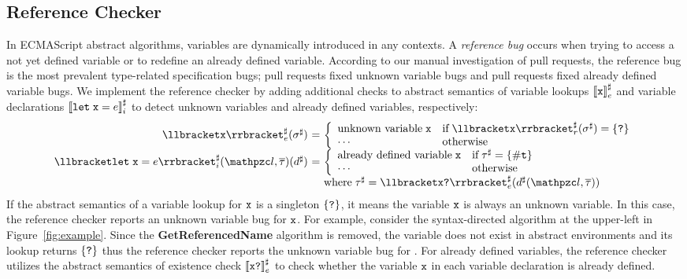 \subsection{Reference Checker}

In ECMAScript abstract algorithms, variables are dynamically introduced in any
contexts.  A \textit{reference bug} occurs when trying to access a not yet
defined variable or to redefine an already defined variable.  According to our
manual investigation of pull requests, the reference bug is the most prevalent
type-related specification bugs;  pull requests fixed 
unknown variable bugs and  pull requests fixed  already
defined variable bugs.  We implement the reference checker by adding additional
checks to abstract semantics of variable lookups ${\llbracket{\texttt{x}}\rrbracket}^\sharp_e$ and variable
declarations ${\llbracket{\texttt{let}\; \texttt{x}= e}\rrbracket}^\sharp_i$ to detect unknown variables and
already defined variables, respectively:
\[
  \begin{array}{r@{~}c@{~}l}
    \aseme{\x}(\aenv) &=& \left\{
      \begin{array}{ll}
        \text{unknown variable} \; $\x$
        & \text{if} \; \asemr{\x}(\aenv) = \{ \tabsent \}\\
        \cdots
        & \text{otherwise}\\
      \end{array}
    \right.\\

    \asemi{\kwlet \; \x = \expr}(\lab, \tys)(\aelem) &=& \left\{
      \begin{array}{ll}
        \text{already defined variable} \; $\x$
        & \text{if} \; \aty = \{ \true \}\\
        \cdots
        & \text{otherwise}\\
      \end{array}
    \right.\\ &&
    \text{where} \; \aty = \aseme{\x \kwexists}(\aelem(\lab, \tys))\\
  \end{array}
\]
If the abstract semantics of a variable lookup for $\texttt{x}$ is a singleton $\{
\texttt{?} \}$, it means the variable $\texttt{x}$ is always an unknown variable.  In this
case, the reference checker reports an unknown variable bug for $\texttt{x}$.  For
example, consider the syntax-directed algorithm at the upper-left in
Figure~\ref{fig:example}.  Since the \textbf{GetReferencedName} algorithm is
removed, the variable  does not exist in abstract
environments and its lookup returns $\{ \texttt{?} \}$ thus the reference checker
reports the unknown variable bug for .  For already
defined variables, the reference checker utilizes the abstract semantics of
existence check ${\llbracket{\texttt{x}\texttt{?}}\rrbracket}^\sharp_e$ to check whether the variable $\texttt{x}$ in
each variable declaration is already defined.


